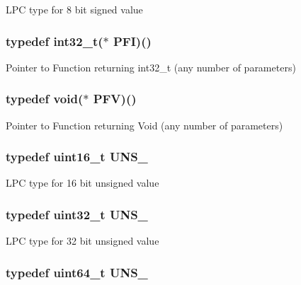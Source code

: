 L\+P\+C type for 8 bit signed value \hypertarget{group___l_p_c___types___public___types_ga39628beaa6435daa2ae29ba204c920da}{
\subsubsection[{P\+F\+I}]{\setlength{\rightskip}{0pt plus 5cm}typedef int32\+\_\+t($\ast$ P\+F\+I)()}}\label{group___l_p_c___types___public___types_ga39628beaa6435daa2ae29ba204c920da}
Pointer to Function returning int32\+\_\+t (any number of parameters) \hypertarget{group___l_p_c___types___public___types_ga2d6ebcfe3babcb204d017c685825a4d8}{
\subsubsection[{P\+F\+V}]{\setlength{\rightskip}{0pt plus 5cm}typedef void($\ast$ P\+F\+V)()}}\label{group___l_p_c___types___public___types_ga2d6ebcfe3babcb204d017c685825a4d8}
Pointer to Function returning Void (any number of parameters) \hypertarget{group___l_p_c___types___public___types_gafce87a7f2271b2cf38d7532f157f8a50}{
\subsubsection[{U\+N\+S\+\_\+16}]{\setlength{\rightskip}{0pt plus 5cm}typedef uint16\+\_\+t {\bf U\+N\+S\+\_}}}\label{group___l_p_c___types___public___types_gafce87a7f2271b2cf38d7532f157f8a50}
L\+P\+C type for 16 bit unsigned value \hypertarget{group___l_p_c___types___public___types_ga28adf5c6b1811ca447826319598d8aba}{
\subsubsection[{U\+N\+S\+\_\+32}]{\setlength{\rightskip}{0pt plus 5cm}typedef uint32\+\_\+t {\bf U\+N\+S\+\_}}}\label{group___l_p_c___types___public___types_ga28adf5c6b1811ca447826319598d8aba}
L\+P\+C type for 32 bit unsigned value \hypertarget{group___l_p_c___types___public___types_ga2299199b92f0535ad8c2e2d8c7c7f09b}{
\subsubsection[{U\+N\+S\+\_\+64}]{\setlength{\rightskip}{0pt plus 5cm}typedef uint64\+\_\+t {\bf U\+N\+S\+\_}}}\label{group___l_p_c___types___public___types_ga2299199b92f0535ad8c2e2d8c7c7f09b}
